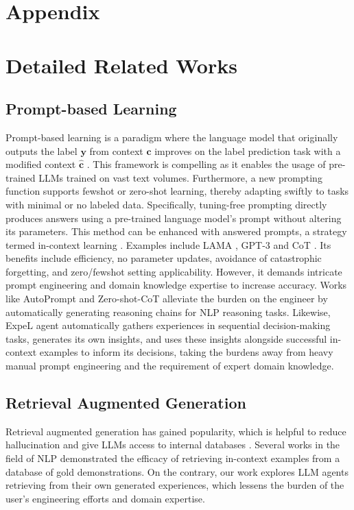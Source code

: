 \documentclass[letterpaper]{article} %
\begin{document}


\onecolumn


\appendix
\section*{Appendix}

\section{Detailed Related Works}
\label{sec:append_related}
\subsection{Prompt-based Learning}
\label{sec:prompt_based_learning}
Prompt-based learning is a paradigm where the language model that originally outputs the label $\mathbf{y}$ from context $\mathbf{c}$ improves on the label prediction task with a modified context $\hat{\mathbf{c}}$ \cite{liu2023pre}. This framework is compelling as it enables the usage of pre-trained LLMs trained on vast text volumes. Furthermore, a new prompting function supports fewshot or zero-shot learning, thereby adapting swiftly to tasks with minimal or no labeled data. Specifically, tuning-free prompting directly produces answers using a pre-trained language model's prompt without altering its parameters. This method can be enhanced with answered prompts, a strategy termed in-context learning \cite{brown2020language}. Examples include LAMA \cite{petroni2019language}, GPT-3 \cite{brown2020language} and CoT \cite{wei2022chain}. Its benefits include efficiency, no parameter updates, avoidance of catastrophic forgetting, and zero/fewshot setting applicability. However, it demands intricate prompt engineering and domain knowledge expertise to increase accuracy. Works like AutoPrompt and Zero-shot-CoT \cite{kojima2022large,zhang2022automatic} alleviate the burden on the engineer by automatically generating reasoning chains for NLP reasoning tasks. Likewise, ExpeL agent automatically gathers experiences in sequential decision-making tasks, generates its own insights, and uses these insights alongside successful in-context examples to inform its decisions, taking the burdens away from heavy manual prompt engineering and the requirement of expert domain knowledge.

\subsection{Retrieval Augmented Generation}
\label{sec:retrieval_augmented_generation}
Retrieval augmented generation has gained popularity, which is helpful to reduce hallucination and give LLMs access to internal databases \cite{li2022survey}. Several works in the field of NLP demonstrated the efficacy of retrieving in-context examples \cite{wang2023learning,rubin2021learning} from a database of gold demonstrations. On the contrary, our work explores LLM agents retrieving from their own generated experiences, which lessens the burden of the user's engineering efforts and domain expertise.
\end{document}
